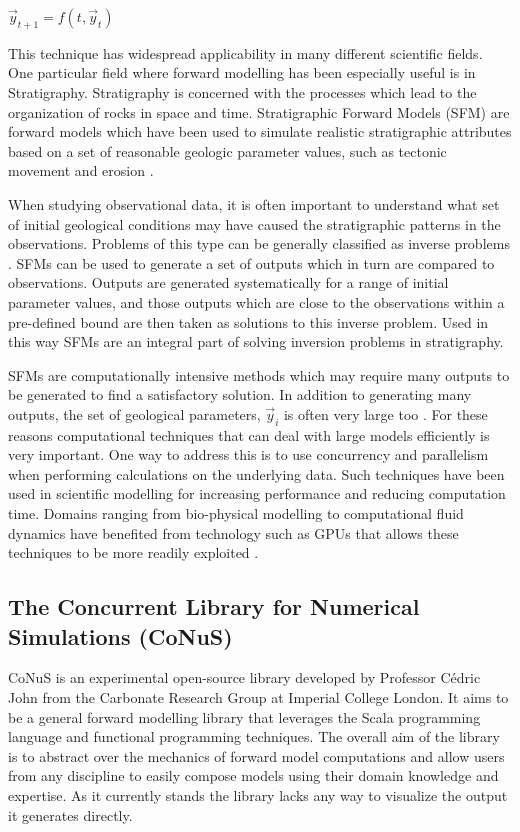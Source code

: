 \documentclass[12pt]{article}
\begin{document}
\begin{center}
	\vspace{0.5cm}
	$\vec y_{t+1} = f(t, \vec y_t)$
	\vspace{0.5cm}
\end{center}


This technique has widespread applicability in many different scientific fields. One particular field where forward modelling has been especially useful is in Stratigraphy. Stratigraphy is concerned with the processes which lead to the organization of rocks in space and time.
Stratigraphic Forward Models (SFM) are forward models which have been used to simulate realistic stratigraphic attributes based on a set of reasonable geologic parameter values, such as tectonic movement and erosion \cite{10.2110/pec.99.62.0069}.

When studying observational data, it is often important to understand what set of initial geological conditions may have caused the stratigraphic patterns in the observations. Problems of this type can be generally classified as inverse problems \cite{10.1260/0144598011492363}. SFMs can be used to generate a set of outputs which in turn are compared to observations. Outputs are generated systematically for a range of initial parameter values, and those outputs which are close to the observations within a pre-defined bound are then taken as solutions to this inverse problem. Used in this way SFMs are an integral part of solving inversion problems in stratigraphy.

SFMs are computationally intensive methods which may require many outputs to be generated to find a satisfactory solution. In addition to generating many outputs, the set of geological parameters, $\vec y_i$ is often very large too \cite{10.1260/0144598011492363}. For these reasons computational techniques that can deal with large models efficiently is very important. One way to address this is to use concurrency and parallelism when performing calculations on the underlying data. Such techniques have been used in scientific modelling for increasing performance and reducing computation time. Domains ranging from bio-physical modelling to computational fluid dynamics have benefited from technology such as GPUs that allows these techniques to be more readily exploited \cite{4490127}.

\subsection{The Concurrent Library for Numerical Simulations (CoNuS)}
CoNuS is an experimental open-source library developed by Professor Cédric John from the Carbonate Research Group at Imperial College London. It aims to be a general forward modelling library that leverages the Scala programming language and functional programming techniques. The overall aim of the library is to abstract over the mechanics of forward model computations and allow users from any discipline to easily compose models using their domain knowledge and expertise. As it currently stands the library lacks any way to visualize the output it generates directly.
\end{document}

